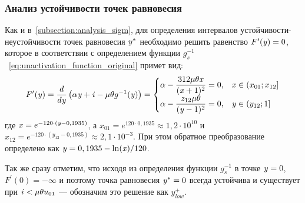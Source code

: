 \subsubsection{Анализ устойчивости точек равновесия}

Как и в~\autoref{subsection:analysis_sigm}, для определения интервалов устойчивости-неустойчивости точек равновесия $\mathit{y}^{*}$ необходимо решить равенство $F^{\prime}(\mathit{y}) = 0$, которое в соответствии с определением функции $g^{-1}_{s}$~\eqref{eq:unactivation_function_original} примет вид:
\begin{equation}
\nonumber
    F^{\prime}(\mathit{y}) = \dfrac{d}{d\mathit{y}}\left( \alpha \mathit{y} + \mathit{i} - \mu \theta g^{-1}(\mathit{y}) \right) = 
    \begin{cases}
        \alpha - \dfrac{312 \mu \theta \mathit{x}}{(\mathit{x} + 1)^{2}} = 0,   & \mathit{x} \in \left(x_{01}; x_{12}\right] \\
        \alpha - \dfrac{z_{12} \mu \theta}{(\mathit{y} - 1)^{2}} = 0,           & \mathit{y} \in \left(y_{12}; 1\right] \\
    \end{cases}
\end{equation}
где $\mathit{x} = e^{-120 \cdot (\mathit{y} - 0,1935)}$, а $x_{01} = e^{120 \cdot 0,1935} \approx 1,2 \cdot 10^{10}$ и $x_{12} = e^{-120 \cdot (y_{12} - 0,1935)} \approx 2,1 \cdot 10^{-3}$. При этом обратное преобразование определено как $\mathit{y} = 0,1935 - \ln(\mathit{x}) / 120$.

Так же сразу отметим, что исходя из определения функции $g^{-1}_{s}$ в точке $\mathit{y} = 0$, $F^{\prime}(0) = -\infty$ и поэтому точка равновесия $\mathit{y}^{*} = 0$ всегда устойчива и существует при $\mathit{i} < \mu \theta u_{01}$ --- обозначим это решение как $y_{low}^{+}$.

